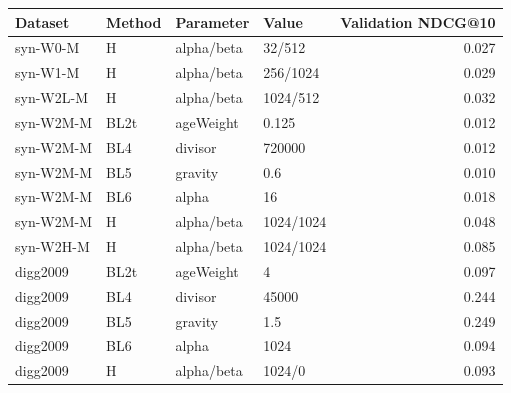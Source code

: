 \begin{tabular}{llllr}
\toprule
Dataset & Method & Parameter & Value & Validation NDCG@10 \\
\midrule
syn-W0-M & H & alpha/beta & 32/512 & 0.027 \\
syn-W1-M & H & alpha/beta & 256/1024 & 0.029 \\
syn-W2L-M & H & alpha/beta & 1024/512 & 0.032 \\
syn-W2M-M & BL2t & ageWeight & 0.125 & 0.012 \\
syn-W2M-M & BL4 & divisor & 720000 & 0.012 \\
syn-W2M-M & BL5 & gravity & 0.6 & 0.010 \\
syn-W2M-M & BL6 & alpha & 16 & 0.018 \\
syn-W2M-M & H & alpha/beta & 1024/1024 & 0.048 \\
syn-W2H-M & H & alpha/beta & 1024/1024 & 0.085 \\
digg2009 & BL2t & ageWeight & 4 & 0.097 \\
digg2009 & BL4 & divisor & 45000 & 0.244 \\
digg2009 & BL5 & gravity & 1.5 & 0.249 \\
digg2009 & BL6 & alpha & 1024 & 0.094 \\
digg2009 & H & alpha/beta & 1024/0 & 0.093 \\
\bottomrule
\end{tabular}
